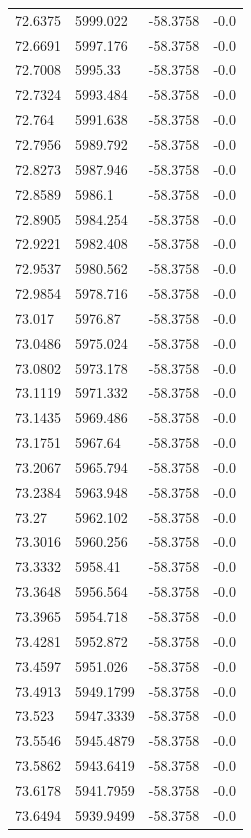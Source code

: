 \begin{table}[H]
\begin{tabular}{llll}
72.6375 & 5999.022 & -58.3758 & -0.0 \\
72.6691 & 5997.176 & -58.3758 & -0.0 \\
72.7008 & 5995.33 & -58.3758 & -0.0 \\
72.7324 & 5993.484 & -58.3758 & -0.0 \\
72.764 & 5991.638 & -58.3758 & -0.0 \\
72.7956 & 5989.792 & -58.3758 & -0.0 \\
72.8273 & 5987.946 & -58.3758 & -0.0 \\
72.8589 & 5986.1 & -58.3758 & -0.0 \\
72.8905 & 5984.254 & -58.3758 & -0.0 \\
72.9221 & 5982.408 & -58.3758 & -0.0 \\
72.9537 & 5980.562 & -58.3758 & -0.0 \\
72.9854 & 5978.716 & -58.3758 & -0.0 \\
73.017 & 5976.87 & -58.3758 & -0.0 \\
73.0486 & 5975.024 & -58.3758 & -0.0 \\
73.0802 & 5973.178 & -58.3758 & -0.0 \\
73.1119 & 5971.332 & -58.3758 & -0.0 \\
73.1435 & 5969.486 & -58.3758 & -0.0 \\
73.1751 & 5967.64 & -58.3758 & -0.0 \\
73.2067 & 5965.794 & -58.3758 & -0.0 \\
73.2384 & 5963.948 & -58.3758 & -0.0 \\
73.27 & 5962.102 & -58.3758 & -0.0 \\
73.3016 & 5960.256 & -58.3758 & -0.0 \\
73.3332 & 5958.41 & -58.3758 & -0.0 \\
73.3648 & 5956.564 & -58.3758 & -0.0 \\
73.3965 & 5954.718 & -58.3758 & -0.0 \\
73.4281 & 5952.872 & -58.3758 & -0.0 \\
73.4597 & 5951.026 & -58.3758 & -0.0 \\
73.4913 & 5949.1799 & -58.3758 & -0.0 \\
73.523 & 5947.3339 & -58.3758 & -0.0 \\
73.5546 & 5945.4879 & -58.3758 & -0.0 \\
73.5862 & 5943.6419 & -58.3758 & -0.0 \\
73.6178 & 5941.7959 & -58.3758 & -0.0 \\
73.6494 & 5939.9499 & -58.3758 & -0.0 \\

\end{tabular}
\end{table}

